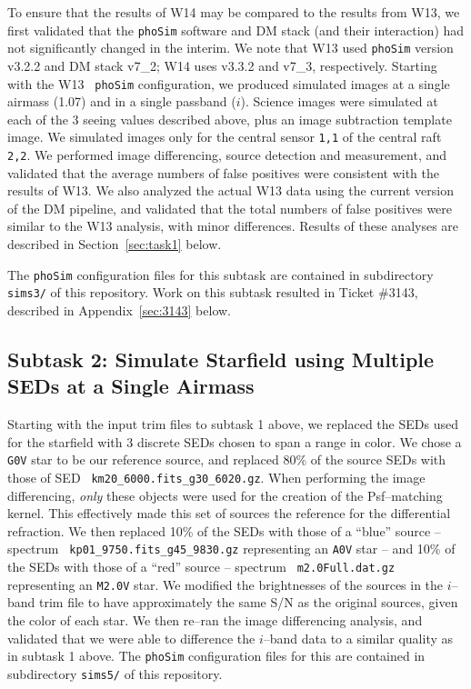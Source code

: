 \documentclass[prd, nofootinbib, floatfix, 11pt, tightenlines, times]{article}
\begin{document}
To ensure that the results of W14 may be compared to the results from
W13, we first validated that the {\tt phoSim} software and DM stack
(and their interaction) had not significantly changed in the interim.
We note that W13 used {\tt phoSim} version v3.2.2 and DM stack v7\_2;
W14 uses v3.3.2 and v7\_3, respectively.  Starting with the W13 {\tt
  phoSim} configuration, we produced simulated images at a single
airmass (1.07) and in a single passband ($i$).  Science images were
simulated at each of the 3 seeing values described above, plus an
image subtraction template image.  We simulated images only for the
central sensor {\tt 1,1} of the central raft {\tt 2,2}.  We performed
image differencing, source detection and measurement, and validated
that the average numbers of false positives were consistent with the
results of W13.  We also analyzed the actual W13 data using the
current version of the DM pipeline, and validated that the total
numbers of false positives were similar to the W13 analysis, with
minor differences.  Results of these analyses are described in
Section~\ref{sec:task1} below.

The {\tt phoSim} configuration files for this subtask are contained in
subdirectory {\tt sims3/} of this repository.  Work on this subtask
resulted in Ticket \#3143, described in Appendix~\ref{sec:3143} below.

\subsection{Subtask 2: Simulate Starfield using Multiple SEDs at a Single Airmass}

Starting with the input trim files to subtask 1 above, we replaced the
SEDs used for the starfield with 3 discrete SEDs chosen to span a
range in color.  We chose a {\tt G0V} star to be our reference source,
and replaced 80\% of the source SEDs with those of SED {\tt
  km20\_6000.fits\_g30\_6020.gz}.  When performing the image
differencing, {\it only} these objects were used for the creation of
the Psf--matching kernel.  This effectively made this set of sources
the reference for the differential refraction.  We then replaced 10\%
of the SEDs with those of a ``blue'' source -- spectrum {\tt
  kp01\_9750.fits\_g45\_9830.gz} representing an {\tt A0V} star -- and
10\% of the SEDs with those of a ``red'' source -- spectrum {\tt
  m2.0Full.dat.gz} representing an {\tt M2.0V} star.  We modified the
brightnesses of the sources in the $i$--band trim file to have
approximately the same S/N as the original sources, given the color of
each star.  We then re--ran the image differencing analysis, and
validated that we were able to difference the $i$--band data to a
similar quality as in subtask 1 above.  The {\tt phoSim} configuration
files for this are contained in subdirectory {\tt sims5/} of this
repository.
\end{document}
